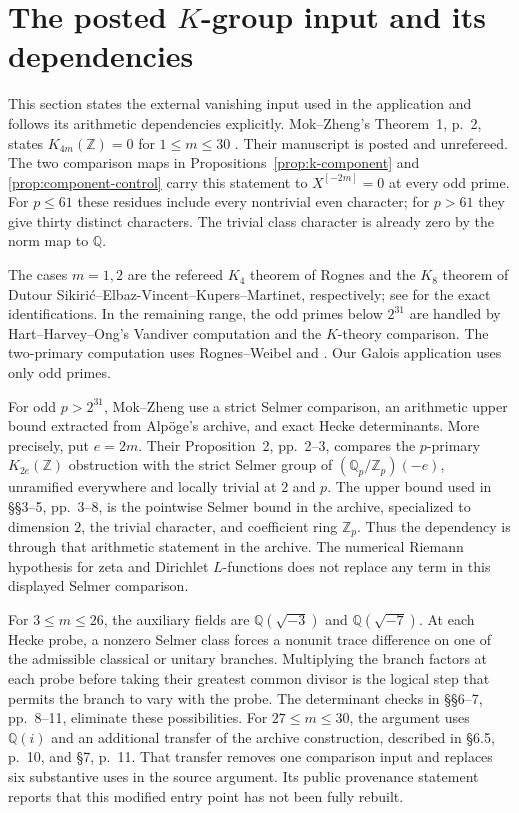 \section{The posted $K$-group input and its dependencies}
\label{sec:dependencies}

This section states the external vanishing input used in the
application and follows its arithmetic dependencies explicitly.
Mok--Zheng's Theorem~1, p.~2, states
$K_{4m}(\mathbb Z)=0$ for $1\leq m\leq30$ \cite{MZ}.
Their manuscript is posted and unrefereed. The two comparison
maps in Propositions~\ref{prop:k-component} and
\ref{prop:component-control} carry this statement to
$X^{[-2m]}=0$ at every odd prime. For $p\leq61$ these residues
include every nontrivial even character; for $p>61$ they give
thirty distinct characters. The trivial class character is
already zero by the norm map to $\mathbb Q$.

The cases $m=1,2$ are the refereed $K_4$ theorem of Rognes
and the $K_8$ theorem of Dutour Sikiri\'c--Elbaz-Vincent--Kupers--Martinet,
respectively; see \cite[\S2, pp.~2--3]{MZ} for the exact
identifications. In the remaining range, the odd primes below
$2^{31}$ are handled by Hart--Harvey--Ong's Vandiver computation
\cite[\S1, assertion~(2)]{HHO} and the $K$-theory comparison.
The two-primary computation uses Rognes--Weibel and
\cite[VI, Corollary~9.8]{Weibel}. Our Galois application uses
only odd primes.

For odd $p>2^{31}$, Mok--Zheng use a strict Selmer comparison,
an arithmetic upper bound extracted from Alp\"oge's archive,
and exact Hecke determinants. More precisely, put $e=2m$.
Their Proposition~2, pp.~2--3, compares the $p$-primary
$K_{2e}(\mathbb Z)$ obstruction with the strict Selmer group
of $(\mathbb Q_p/\mathbb Z_p)(-e)$, unramified everywhere and
locally trivial at $2$ and $p$. The upper bound used in
\S\S3--5, pp.~3--8, is the pointwise Selmer bound in the
archive, specialized to dimension $2$, the trivial character,
and coefficient ring $\mathbb Z_p$. Thus the dependency is
through that arithmetic statement in the archive. The
numerical Riemann hypothesis for zeta and Dirichlet $L$-functions
does not replace any term in this displayed Selmer comparison.

For $3\leq m\leq26$, the auxiliary fields are
$\mathbb Q(\sqrt{-3})$ and $\mathbb Q(\sqrt{-7})$.
At each Hecke probe, a nonzero Selmer class forces a nonunit
trace difference on one of the admissible classical or
unitary branches. Multiplying the branch factors at each
probe before taking their greatest common divisor is the
logical step that permits the branch to vary with the probe.
The determinant checks in \S\S6--7, pp.~8--11, eliminate
these possibilities. For $27\leq m\leq30$, the argument uses
$\mathbb Q(i)$ and an additional transfer of the archive
construction, described in \S6.5, p.~10, and \S7, p.~11.
That transfer removes one comparison input and replaces six
substantive uses in the source argument. Its public provenance
statement reports that this modified entry point has not
been fully rebuilt.

